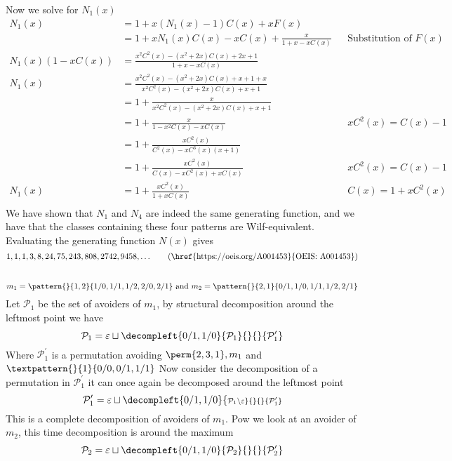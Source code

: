 Now we solve  for \(N_1(x)\)
\begin{equation}
    \begin{aligned}
        N_1(x)&= 1+x(N_1(x)-1)C(x)+xF(x)\\
        &= 1+xN_1(x)C(x)-xC(x)+\frac{x}{1+x-xC(x)} &&\text{Substitution of \(F(x)\)}\\
        N_1(x)(1-xC(x))&= \frac{x^2C^2(x) - (x^2+2x)C(x) + 2x+1}{1+x-xC(x)}\\
        N_1(x) &= \frac{x^2C^2(x) - (x^2+2x)C(x) + x+1+x}{x^2C^2(x) - (x^2+2x)C(x) +x+1}\\
        &= 1 +\frac{x}{x^2C^2(x) - (x^2+2x)C(x) +x+1}\\
        &= 1 + \frac{x}{1-x^2C(x)-xC(x)} && xC^2(x) = C(x)-1\\
        &= 1 + \frac{xC^2(x)}{C^2(x) - xC^3(x)(x+1)}\\
        &= 1 + \frac{xC^2(x)}{C(x) - xC^2(x) + xC(x)} && xC^2(x) = C(x)-1\\
        N_1(x)&= 1 + \frac{xC^2(x)}{1+xC(x)} && C(x) = 1+xC^2(x)\\
    \end{aligned}
\end{equation}
We have shown that \(N_1\) and \(N_4\) are indeed the same generating function,
and we have that the classes containing these four patterns are Wilf-equivalent.
Evaluating the generating function \(N(x)\) gives
\begin{equation*}
    1, 1, 1, 3, 8, 24, 75, 243, 808, 2742, 9458,\dotsc \tag{\href{https://oeis.org/A001453}{OEIS: A001453}}
\end{equation*}

\subsection{}
\begin{equation*}
    m_1 = \pattern{}{1,2}{1/0,1/1,1/2,2/0,2/1} \text{ and }
    m_2 = \pattern{}{2,1}{0/1,1/0,1/1,1/2,2/1}
\end{equation*}
Let \(\mathcal{P}_1\) be the set of avoiders of \(m_1\), by structural decomposition
around the leftmost point we have
\begin{equation*}
    \mathcal{P}_1 = \varepsilon \sqcup
    \decompleft{0/1,1/0}{\mathcal{P}_1}{}{}{\mathcal{P}^\prime_1}
\end{equation*}
Where \(\mathcal{P}^\prime_1\) is a permutation avoiding \(\perm{2,3,1}, m_1\)
and \(\textpattern{}{1}{0/0,0/1,1/1}\)
Now consider the decomposition of a permutation in \(\mathcal{P}^\prime_1\) it can
once again be decomposed around the leftmost point
\begin{equation*}
    \mathcal{P}^\prime_1 = \varepsilon \sqcup
    \decompleft{0/1,1/0}{\scriptstyle \mathcal{P}_1\setminus\varepsilon}{}{}{\mathcal{P}^\prime_1}
\end{equation*}
This is a complete decomposition of avoiders of \(m_1\). Pow we
look at an avoider of \(m_2\), this time decomposition is around the maximum
\begin{equation*}
    \mathcal{P}_2 = \varepsilon \sqcup
    \decompleft{0/1,1/0}{\mathcal{P}_2}{}{}{\mathcal{P}^\prime_2}
\end{equation*}

